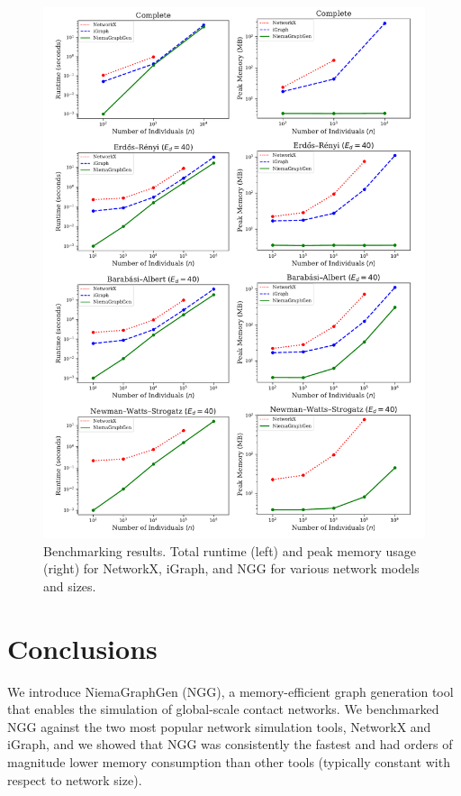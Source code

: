 \documentclass[a4paper,num-refs,gigabyte]{oup-contemporary}
\begin{document}
\begin{figure}%
\centering
\includegraphics[width=\textwidth]{Fig1}
\caption{Benchmarking results. Total runtime (left) and peak memory usage (right) for NetworkX, iGraph, and NGG for various network models and sizes.}\label{fig:benchmark}
\end{figure}

\section{Conclusions}
We introduce NiemaGraphGen (NGG), a memory-efficient graph generation tool that enables the simulation of global-scale contact networks. We benchmarked NGG against the two most popular network simulation tools, NetworkX and iGraph, and we showed that NGG was consistently the fastest and had orders of magnitude lower memory consumption than other tools (typically constant with respect to network size).
\end{document}
